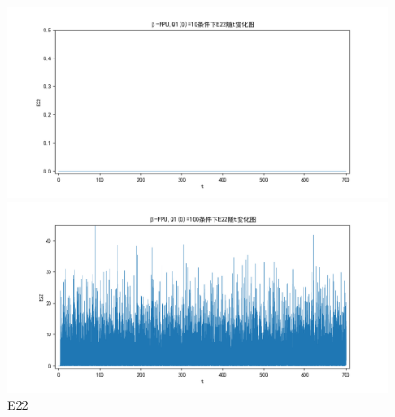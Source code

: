 \documentclass[10pt, a4paper]{article}
\begin{document}
    \begin{figure}[H]
        \begin{minipage}[t]{0.49\textwidth}
            \centering
            \includegraphics[width=\textwidth]{./q6_pics/cmp/E22.png}
        \end{minipage}
        \begin{minipage}[t]{0.49\textwidth}
            \centering
            \includegraphics[width=\textwidth]{./q6_pics/exp/E22.png}
        \end{minipage}
        \caption{E22}\label{fig:E22 in q6}
    \end{figure}
\end{document}

